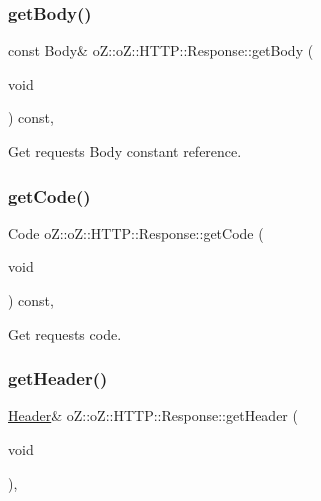 \subsubsection{\texorpdfstring{getBody()}{getBody()}\hspace{0.1cm}{\footnotesize\ttfamily [2/2]}}
{\footnotesize\ttfamily const Body\& o\+Z\+::o\+Z\+::\+H\+T\+T\+P\+::\+Response\+::get\+Body (\begin{DoxyParamCaption}\item[{void}]{ }\end{DoxyParamCaption}) const\hspace{0.3cm}{\ttfamily [inline]}, {\ttfamily [noexcept]}}



Get request\textquotesingle{}s Body constant reference. 

\mbox{\label{classo_z_1_1o_z_1_1_h_t_t_p_1_1_response_aacfdfb400c4c7e8f46a6b7967b9e174f}} 
\subsubsection{\texorpdfstring{getCode()}{getCode()}}
{\footnotesize\ttfamily Code o\+Z\+::o\+Z\+::\+H\+T\+T\+P\+::\+Response\+::get\+Code (\begin{DoxyParamCaption}\item[{void}]{ }\end{DoxyParamCaption}) const\hspace{0.3cm}{\ttfamily [inline]}, {\ttfamily [noexcept]}}



Get request\textquotesingle{}s code. 

\mbox{\label{classo_z_1_1o_z_1_1_h_t_t_p_1_1_response_a38279a872d9c2c731fc43493995afabe}} 
\subsubsection{\texorpdfstring{getHeader()}{getHeader()}\hspace{0.1cm}{\footnotesize\ttfamily [1/2]}}
{\footnotesize\ttfamily \mbox{\hyperlink{classo_z_1_1o_z_1_1_h_t_t_p_1_1_header}{Header}}\& o\+Z\+::o\+Z\+::\+H\+T\+T\+P\+::\+Response\+::get\+Header (\begin{DoxyParamCaption}\item[{void}]{ }\end{DoxyParamCaption})\hspace{0.3cm}{\ttfamily [inline]}, {\ttfamily [noexcept]}}



